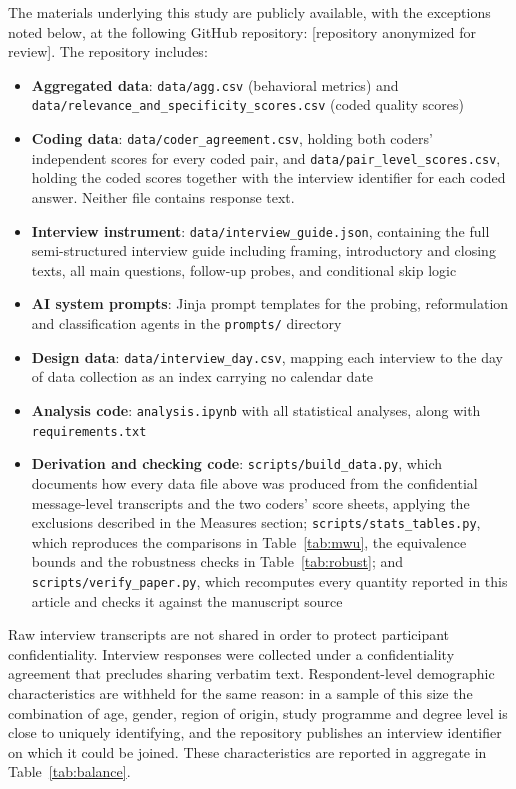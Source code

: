 \documentclass[12pt]{article}
\begin{document}
The materials underlying this study are publicly available, with the exceptions noted below, at the following GitHub repository: [repository anonymized for review]. The repository includes:
\begin{sloppypar}
\begin{itemize}
  \item \textbf{Aggregated data}: \texttt{data/agg.csv} (behavioral
    metrics) and \texttt{data/relevance\_and\_specificity\_scores.csv}
    (coded quality scores)
  \item \textbf{Coding data}: \texttt{data/coder\_agreement.csv}, holding
    both coders' independent scores for every coded pair, and
    \texttt{data/pair\_level\_scores.csv}, holding the coded scores
    together with the interview identifier for each coded answer.
    Neither file contains response text.
  \item \textbf{Interview instrument}: \texttt{data/interview\_guide.json},
    containing the full semi-structured interview guide including
    framing, introductory and closing texts, all main questions,
    follow-up probes, and conditional skip logic
  \item \textbf{AI system prompts}: Jinja prompt templates for the
    probing, reformulation and classification agents in the
    \texttt{prompts/} directory
  \item \textbf{Design data}: \texttt{data/interview\_day.csv}, mapping each
    interview to the day of data collection as an index carrying no
    calendar date
  \item \textbf{Analysis code}: \texttt{analysis.ipynb} with all
    statistical analyses, along with \texttt{requirements.txt}
  \item \textbf{Derivation and checking code}: \texttt{scripts/build\_data.py},
    which documents how every data file above was produced from the confidential message-level
    transcripts and the two coders' score sheets, applying the
    exclusions described in the Measures section;
    \texttt{scripts/stats\_tables.py}, which reproduces the comparisons in
    Table~\ref{tab:mwu}, the equivalence bounds and the robustness
    checks in Table~\ref{tab:robust}; and
    \texttt{scripts/verify\_paper.py}, which recomputes every quantity
    reported in this article and checks it against the manuscript source
\end{itemize}
\end{sloppypar}
Raw interview transcripts are not shared in order to protect participant confidentiality. Interview responses were collected under a confidentiality agreement that precludes sharing verbatim text. Respondent-level demographic characteristics are withheld for the same reason: in a sample of this size the combination of age, gender, region of origin, study programme and degree level is close to uniquely identifying, and the repository publishes an interview identifier on which it could be joined. These characteristics are reported in aggregate in Table~\ref{tab:balance}.
\end{document}
